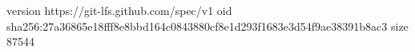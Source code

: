 version https://git-lfs.github.com/spec/v1
oid sha256:27a36865e18fff8e8bbd164c0843880cf8e1d293f1683e3d54f9ae38391b8ac3
size 87544
